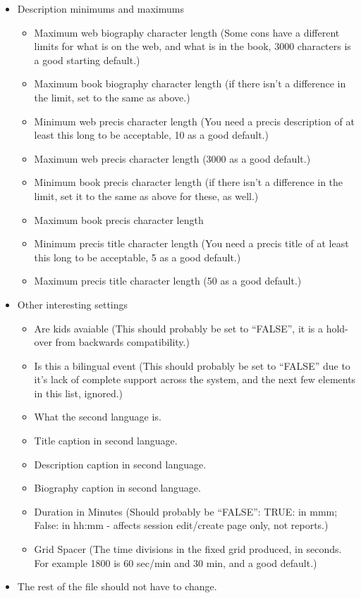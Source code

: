 \documentclass[tablesignature]{scrartcl}
\begin{document}
\begin{itemize}
\item Description minimums and maximums
\label{sec-1_2_3_4}%
\begin{itemize}
\item Maximum web biography character length (Some cons have a different limits for what is on the web, and what is in the book, 3000 characters is a good starting default.)
\item Maximum book biography character length (if there isn't a difference in the limit, set to the same as above.)
\item Minimum web precis character length (You need a precis description of at least this long to be acceptable, 10 as a good default.)
\item Maximum web precis character length (3000 as a good default.)
\item Minimum book precis character length (if there isn't a difference in the limit, set it to the same as above for these, as well.)
\item Maximum book precis character length
\item Minimum precis title character length (You need a precis title of at least this long to be acceptable, 5 as a good default.)
\item Maximum precis title character length (50 as a good default.)
\end{itemize}


\item Other interesting settings
\label{sec-1_2_3_5}%
\begin{itemize}
\item Are kids avaiable (This should probably be set to ``FALSE'', it is a hold-over from backwards compatibility.)
\item Is this a bilingual event (This should probably be set to ``FALSE'' due to it's lack of complete support across the system, and the next few elements in this list, ignored.)
\item What the second language is.
\item Title caption in second language.
\item Description caption in second language.
\item Biography caption in second language.
\item Duration in Minutes (Should probably be ``FALSE'': TRUE: in mmm; False: in hh:mm - affects session edit/create page only, not reports.)
\item Grid Spacer (The time divisions in the fixed grid produced, in seconds.  For example 1800 is 60 sec/min and 30 min, and a good default.)
\end{itemize}


\item The rest of the file should not have to change.\\
\label{sec-1_2_3_6}%
\end{itemize} %
\end{document}

